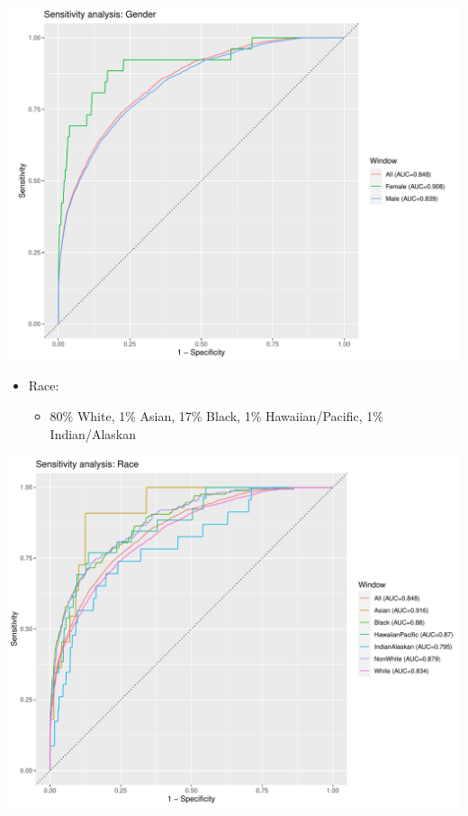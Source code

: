 \documentclass[12pt]{article}
\begin{document}
\begin{center}
\includegraphics[width=\textwidth]{sensitivity_identity/roc_curves_Gender.pdf}
\end{center}

\newpage
\begin{itemize}
	\item Race: 
	\begin{itemize}
		\item 80\% White, 1\% Asian, 17\% Black, 1\% Hawaiian/Pacific, 1\% Indian/Alaskan
	\end{itemize}
\end{itemize}

\begin{center}
\includegraphics[width=\textwidth]{sensitivity_identity/roc_curves_Race.pdf}
\end{center}
\end{document}
